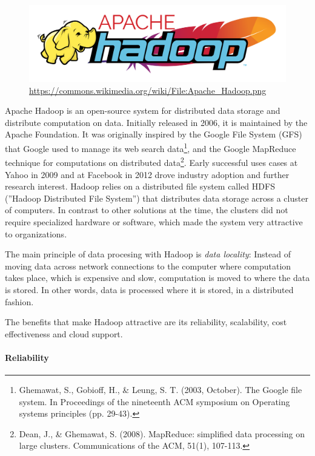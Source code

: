 \begin{figure}
\begin{center}
\includegraphics[width=.33\textwidth]{Apache_Hadoop.png}
\scriptsize \url{https://commons.wikimedia.org/wiki/File:Apache_Hadoop.png}
\end{center}
\end{figure}

Apache Hadoop is an open-source system for distributed data storage and distribute computation on data. Initially released in 2006, it is maintained by the Apache Foundation. It was originally inspired by the Google File System (GFS) that Google used to manage its web search data\footnote{Ghemawat, S., Gobioff, H., \& Leung, S. T. (2003, October). The Google file system. In Proceedings of the nineteenth ACM symposium on Operating systems principles (pp. 29-43).}, and the Google MapReduce technique for computations on distributed data\footnote{Dean, J., \& Ghemawat, S. (2008). MapReduce: simplified data processing on large clusters. Communications of the ACM, 51(1), 107-113.}. Early successful uses cases at Yahoo in 2009 and at Facebook in 2012 drove industry adoption and further research interest. Hadoop relies on a distributed file system called HDFS (''Hadoop Distributed File System'') that distributes data storage across a cluster of computers. In contrast to other solutions at the time, the clusters did not require specialized hardware or software, which made the system very attractive to organizations. 

The main principle of data procesing with Hadoop is \emph{data locality}: Instead of moving data across network connections to the computer where computation takes place, which is expensive and slow, computation is moved to where the data is stored. In other words, data is processed where it is stored, in a distributed fashion.

The benefits that make Hadoop attractive are its reliability, scalability, cost effectiveness and cloud support. 

\paragraph*{Reliability}

